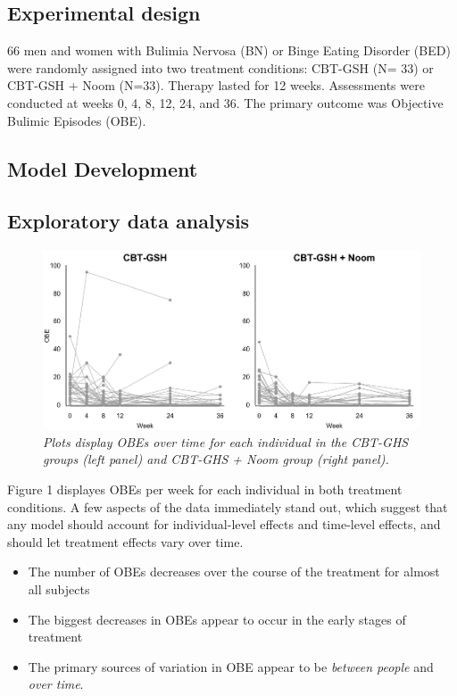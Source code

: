 \documentclass[12pt, oneside]{article}
\begin{document}
\subsection{Experimental design}

66 men and women with Bulimia Nervosa (BN) or Binge Eating Disorder (BED) were randomly assigned into two treatment conditions: CBT-GSH (N= 33) or CBT-GSH + Noom (N=33).  Therapy lasted for 12 weeks.  Assessments were conducted at weeks 0, 4, 8, 12, 24, and 36.  The primary outcome was Objective Bulimic Episodes (OBE).  

\subsection{Model Development}
\subsection*{Exploratory data analysis}

\begin{figure}[h]
\centering
\includegraphics[width=\textwidth, height=\textheight, keepaspectratio]{Noom_paths.png}
\caption{\emph{Plots display OBEs over time for each individual in the CBT-GHS groups (left panel) and CBT-GHS + Noom group (right panel).}}
\end{figure}

Figure 1 displayes OBEs per week for each individual in both treatment conditions.  A few aspects of the data immediately stand out, which suggest that any model should account for individual-level effects and time-level effects, and should let treatment effects vary over time.  
\begin{itemize}
\item{The number of OBEs decreases over the course of the treatment for almost all subjects}
\item{The biggest decreases in OBEs appear to occur in the early stages of treatment}
\item{The primary sources of variation in OBE appear to be \emph{between people} and \emph{over time}.}
\end{itemize}
\end{document}
